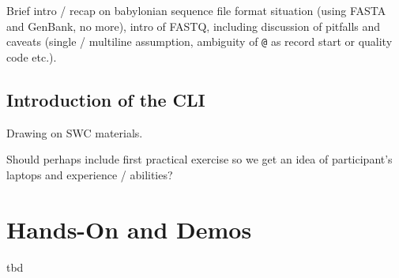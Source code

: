 \documentclass[a4paper,fleqn]{article}
\begin{document}
Brief intro / recap on babylonian sequence file format situation
(using FASTA and GenBank, no more), intro of FASTQ, including
discussion of pitfalls and caveats (single / multiline assumption,
ambiguity of \texttt{@} as record start or quality code etc.).


\subsection{Introduction of the CLI}

Drawing on SWC materials.

Should perhaps include first practical exercise so we get an idea of
participant's laptops and experience / abilities?



\section{Hands-On and Demos}

tbd
\end{document}
